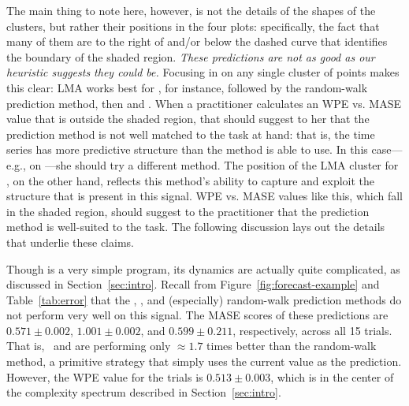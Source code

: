 The main thing to note here, however, is not the details of the shapes
of the clusters, but rather their positions in the four plots:
specifically, the fact that many of them are to the right of and/or
below the dashed curve that identifies the boundary of the shaded
region.  \emph{These predictions are not as good as our heuristic
  suggests they could be.}  Focusing in on any single cluster of
points makes this clear: LMA works best for \svdsix, for instance,
followed by the random-walk prediction method, then \arima and \naive.
When a practitioner calculates an WPE vs. MASE value that is outside the
shaded region, that should suggest to her that the prediction method
is not well matched to the task at hand: that is, the time series has
more predictive structure than the method is able to use.
%
%
In this case---e.g., \arima on \svdsix---she should try a different
method.  The position of the LMA cluster for \svdsix, on the other
hand, reflects this method's ability to capture and exploit the
structure that is present in this signal.  WPE vs. MASE values like
this, which fall in the shaded region, should suggest to the
practitioner that the prediction method is well-suited to the task.
The following discussion lays out the details that underlie these
claims.
%
%

Though \col is a very simple program, its dynamics are actually quite
complicated, as discussed in Section~\ref{sec:intro}.  Recall from
Figure~\ref{fig:forecast-example} and Table~\ref{tab:error} that the
\naive, \arima, and (especially) random-walk prediction methods do not
perform very well on this signal.  The MASE scores of these
predictions are $0.571 \pm 0.002$, $1.001 \pm 0.002$, and $0.599 \pm
0.211$, respectively, across all 15 trials.  That is, \naive ~and
\arima are performing only $\approx 1.7$ times better than the
random-walk method, a primitive strategy that simply uses the current
value as the prediction.  However, the WPE value for the \col trials
is $0.513 \pm 0.003$, which is in the center of the complexity
spectrum described in Section~\ref{sec:intro}.


